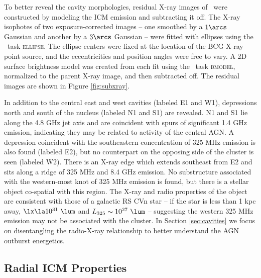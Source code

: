 \documentclass[11pt, preprint]{aastex}
\begin{document}
To better reveal the cavity morphologies, residual X-ray images of
\rbs\ were constructed by modeling the ICM emission and subtracting it
off. The X-ray isophotes of two exposure-corrected images -- one
smoothed by a $1\arcs$ Gaussian and another by a $3\arcs$ Gaussian --
were fitted with ellipses using the \iraf\ task \textsc{ellipse}. The
ellipse centers were fixed at the location of the BCG X-ray point
source, and the eccentricities and position angles were free to
vary. A 2D surface brightness model was created from each fit using
the \iraf\ task \textsc{bmodel}, normalized to the parent X-ray image,
and then subtracted off. The residual images are shown in Figure
\ref{fig:subxray}.

In addition to the central east and west cavities (labeled E1 and W1),
depressions north and south of the nucleus (labeled N1 and S1) are
revealed. N1 and S1 lie along the 4.8 GHz jet axis and are coincident
with spurs of significant 1.4 GHz emission, indicating they may be
related to activity of the central AGN. A depression coincident with
the southeastern concentration of 325 MHz emission is also found
(labeled E2), but no counterpart on the opposing side of the cluster
is seen (labeled W2). There is an X-ray edge which extends southeast
from E2 and sits along a ridge of 325 MHz and 8.4 GHz emission. No
substructure associated with the western-most knot of 325 MHz emission
is found, but there is a stellar object co-spatial with this region.
The X-ray and radio properties of the object are consistent with those
of a galactic RS CVn star \citep{1993RPPh...56.1145S} -- if the star
is less than 1 kpc away, $\lx \la 10^{31} ~\lum$ and $L_{325} \sim
10^{27} ~\lum$ -- suggesting the western 325 MHz emission may not be
associated with the cluster. In Section \ref{sec:cavities} we focus on
disentangling the radio-X-ray relationship to better understand the
AGN outburst energetics.

\subsection{Radial ICM Properties}
\label{sec:icm}
\end{document}
